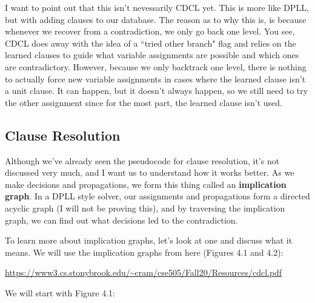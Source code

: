 \documentclass[oneside]{book}
\begin{document}
I want to point out that this isn't nevessarily CDCL yet. This is more like DPLL, but with 
adding clauses to our database. The reason as to why this is, is because whenever we recover 
from a contradiction, we only go back one level. You see, CDCL does away with the idea of a
``tried other branch" flag and relies on the learned clauses to guide what variable assignments
are possible and which ones are contradictory. However, because we only backtrack one level, there 
is nothing to actually force new variable assignments in cases where the learned clause isn't a unit 
clause. It can happen, but it doesn't always happen, so we still need to try the other assignment 
since for the most part, the learned clause isn't used.

\subsection{Clause Resolution}

Although we've already seen the pseudocode for clause resolution, it's not discussed very 
much, and I want us to understand how it works better. As we make decisions and propagations, 
we form this thing called an \textbf{implication graph}. In a DPLL style solver, our assignments 
and propagations form a directed acyclic graph (I will not be proving this), and by traversing the
implication graph, we can find out what decisions led to the contradiction.

To learn more about implication graphs, let's look at one and discuss what it means.
We will use the implication graphs from here (Figures 4.1 and 4.2): 
\begin{center}
    \small{\url{https://www3.cs.stonybrook.edu/~cram/cse505/Fall20/Resources/cdcl.pdf}}
\end{center}

We will start with Figure 4.1:

\end{document}
